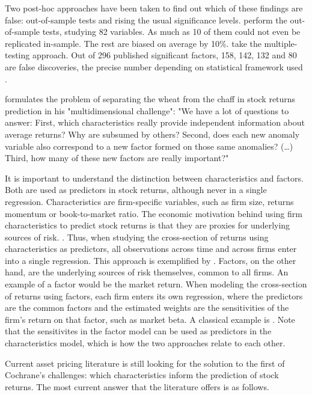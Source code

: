 		Two post-hoc approaches have been taken to find out which of these findings are false: out-of-sample tests and rising the usual significance levels. \cite{mclean2016does} perform the out-of-sample tests, studying 82 variables. As much as 10 of them could not even be replicated in-sample. The rest are biased on average by 10\%. \cite{harvey2016and} take the multiple-testing approach. Out of 296 published significant factors, 158, 142, 132 and 80 are false discoveries, the precise number depending on statistical framework used \cite{harvey2016and}. 
		
		\cite[p.~1060]{cochrane2011presidential} formulates the problem of separating the wheat from the chaff in stock returns prediction in his "multidimensional challenge": "We have a lot of questions to answer: First, which characteristics really provide independent information about average returns? Why are subsumed by others? Second, does each new anomaly variable also correspond to a new factor formed on those same anomalies? (\ldots) Third, how many of these new factors are really important?" 
		
		It is important to understand the distinction between characteristics and factors. Both are used as predictors in stock returns, although never in a single regression.  Characteristics are firm-specific variables, such as firm size, returns momentum or book-to-market ratio. The economic motivation behind using firm characteristics to predict stock returns is that they are proxies for underlying sources of risk. \cite{bryzgalova2019forest, kelly2019characteristics, gu2020empirical}. Thus, when studying the cross-section of returns using characteristics as predictors, all observations across time and across firms enter into a single regression. This approach is exemplified by \cite{kelly2019characteristics, gu2020empirical, bryzgalova2019forest}. Factors, on the other hand, are the underlying sources of risk themselves, common to all firms. An example of a factor would be the market return. When modeling the cross-section of returns using factors, each firm enters its own regression, where the predictors are the common factors and the estimated weights are the sensitivities of the firm's return on that factor, such as market beta. A classical example is \cite{fama1996multifactor, fama2015five}. Note that the sensitivites in the factor model can be used as predictors in the characteristics model, which is how the two approaches relate to each other. 
		
		Current asset pricing literature is still looking for the solution to the first of Cochrane's challenges: which characteristics inform the prediction of stock returns. The most current answer that the literature offers is as follows. 
		
